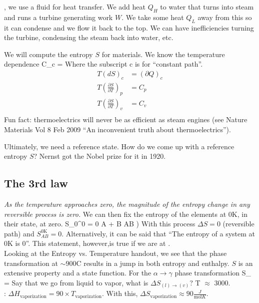 \documentclass[12pt]{article}
\begin{document}
, we use a fluid for heat transfer.  We add heat $Q_H$ to water that turns into steam and runs a turbine generating work $W$.  We take some heat $Q_L$ away from this so it can condense and we flow it back to the top.  We can have inefficiencies turning the turbine, condensing the steam back into water, etc.

We will compute the entropy $S$ for materials.  We know the temperature dependence
\beq C_c =  \ceq
Where the subscript c is for ``constant path''.
\begin{align*}
T(dS)_c &= (\partial Q)_c\\
T(\frac{\partial S}{\partial T})_p &= C_p\\
T(\frac{\partial S}{\partial T})_v &= C_v\\
\end{align*}
Fun fact: thermoelectrics will never be as efficient as steam engines (see Nature Materials Vol 8 Feb 2009 ``An inconvenient truth about thermoelectrics'').

Ultimately, we need a reference state.  How do we come up with a reference entropy $S$?  Nernst got the Nobel prize for it in 1920.

\subsection{The 3rd law}
\emph{As the temperature approaches zero, the magnitude of the entropy change in any reversible process is zero.}
We can then fix the entropy of the elements at 0K, in their  state, at zero. \beq S_{0}^0 = 0 \ceq
\beq A + B \rightarrow AB )\ceq
With this process $\Delta S = 0$ (reversible path) and $S_{AB}^\text{0K} = 0$.  Alternatively, it can be said that ``The entropy of a system at 0K is 0''.  This statement, however,is true if we are at .\\

Looking at the Entropy vs. Temperature handout, we see that the phase transformation at $\sim 900$\degree C results in a jump in both entropy and enthalpy.  $S$ is an extensive property and a state function.  For the $\alpha \rightarrow \gamma$ phase transformation
\beq \Delta S_{\alpha \rightarrow \gamma} =  \ceq
Say that we go from liquid to vapor, what is $\Delta S_{(l) \rightarrow (v)}$?  T $\approx$ 3000.\\

: $\Delta H_\text{vaporization} = 90 \times T_\text{vaporization}$.  With this, $\Delta S_\text{vaporization} \approx 90 \frac{J}{\text{mol} K}$.
\end{document}
